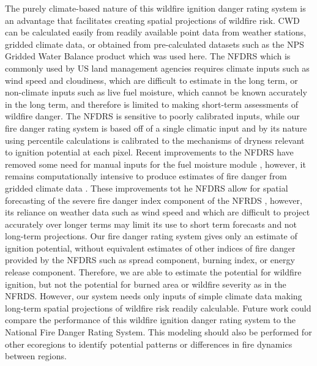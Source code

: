 \documentclass[11p]{article}
\begin{document}

The purely climate-based nature of this wildfire ignition danger rating system is an advantage that facilitates creating spatial projections of wildfire risk. CWD can be calculated easily from readily available point data from weather stations, gridded climate data, or obtained from pre-calculated datasets such as the NPS Gridded Water Balance product \citep{tercekHistoricalChangesPlant2021} which was used here. The NFDRS \citep{degrootChapter11Wildland2015} which is commonly used by US land management agencies requires climate inputs such as wind speed and cloudiness, which are difficult to estimate in the long term, or non-climate inputs such as live fuel moisture, which cannot be known accurately in the long term, and therefore is limited to making short-term assessments of wildfire danger. The NFDRS is sensitive to poorly calibrated inputs, while our fire danger rating system is based off of a single climatic input and by its nature using percentile calculations is calibrated to the mechanisms of dryness relevant to ignition potential at each pixel. Recent improvements to the NFDRS have removed some need for manual inputs for the fuel moisture module \citep{jollyModernizingUSNational2024}, however, it remains computationally intensive to produce estimates of fire danger from gridded climate data \citep{farguellFastSpatialNFDRS2025a}. These improvements tot he NFDRS allow for spatial forecasting of the severe fire danger index component of the NFRDS \citep{jollySevereFireDanger2019}, however, its reliance on weather data such as wind speed and which are difficult to project accurately over longer terms may limit its use to short term forecasts and not long-term projections. Our fire danger rating system gives only an estimate of ignition potential, without equivalent estimates of other indices of fire danger provided by the NFDRS such as spread component, burning index, or energy release component. Therefore, we are able to estimate the potential for wildfire ignition, but not the potential for burned area or wildfire severity as in the NFRDS. However, our system needs only inputs of simple climate data making long-term spatial projections of wildfire risk readily calculable. Future work could compare the performance of this wildfire ignition danger rating system to the National Fire Danger Rating System. This modeling should also be performed for other ecoregions to identify potential patterns or differences in fire dynamics between regions. 
\end{document}
